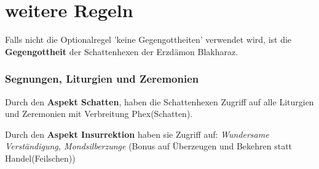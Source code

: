\documentclass[9pt]{article}
\begin{document}
\section{weitere Regeln}
Falls nicht die Optionalregel 'keine Gegengottheiten' verwendet wird, ist die \textbf{Gegengottheit} der Schattenhexen der Erzdämon Blakharaz.

\subsubsection{Segnungen, Liturgien und Zeremonien} Durch den \textbf{Aspekt Schatten}, haben die Schattenhexen Zugriff auf alle Liturgien und Zeremonien mit Verbreitung Phex(Schatten).

Durch den \textbf{Aspekt Insurrektion} haben sie Zugriff auf: \textit{Wundersame Verständigung, Mondsilberzunge} (Bonus auf Überzeugen und Bekehren statt Handel(Feilschen))
\end{document}

